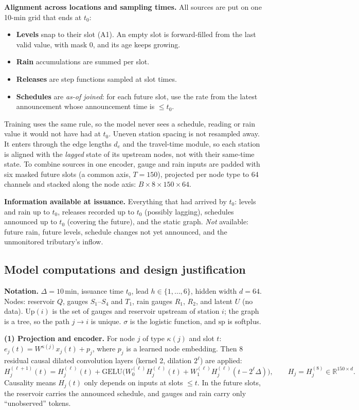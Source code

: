 \textbf{Alignment across locations and sampling times.} All sources are put on one 10-min grid that ends at $t_0$:
\begin{itemize}
\item \textbf{Levels} snap to their slot (A1). An empty slot is forward-filled from the last valid value, with mask 0, and its age keeps growing.
\item \textbf{Rain} accumulations are summed per slot.
\item \textbf{Releases} are step functions sampled at slot times.
\item \textbf{Schedules} are \emph{as-of joined}: for each future slot, use the rate from the latest announcement whose announcement time is $\le t_0$.
\end{itemize}
Training uses the same rule, so the model never sees a schedule, reading or rain value it would not have had at $t_0$.
Uneven station spacing is not resampled away. It enters through the edge lengths $d_e$ and the travel-time
module, so each station is aligned with the \emph{lagged} state of its upstream nodes, not with their same-time state.
To combine sources in one encoder, gauge and rain inputs are padded with six masked future slots (a common axis, $T=150$),
projected per node type to 64 channels and stacked along the node axis: $B\times8\times150\times64$.

\textbf{Information available at issuance.} Everything that had arrived by $t_0$: levels and rain up to $t_0$,
releases recorded up to $t_0$ (possibly lagging), schedules announced up to $t_0$ (covering the future), and the
static graph. \emph{Not} available: future rain, future levels, schedule changes not yet announced, and the
unmonitored tributary's inflow.

\subsection{Model computations and design justification}

\textbf{Notation.} $\Delta=10$\,min, issuance time $t_0$, lead $h\in\{1,\dots,6\}$, hidden width $d=64$.
Nodes: reservoir $Q$, gauges $S_1$--$S_4$ and $T_1$, rain gauges $R_1$, $R_2$, and latent $U$ (no data).
$\mathrm{Up}(i)$ is the set of gauges and reservoir upstream of station $i$; the graph is a tree, so the path
$j\to i$ is unique. $\sigma$ is the logistic function, and $\mathrm{sp}$ is softplus.

\textbf{(1) Projection and encoder.} For node $j$ of type $\kappa(j)$ and slot $t$:
$e_j(t)=W^{\kappa(j)}x_j(t)+p_j$, where $p_j$ is a learned node embedding. Then 8 residual causal
dilated convolution layers (kernel 2, dilation $2^\ell$) are applied:
\[
H^{(\ell+1)}_j(t)=H^{(\ell)}_j(t)+\mathrm{GELU}\big(W^{(\ell)}_0H^{(\ell)}_j(t)+W^{(\ell)}_1H^{(\ell)}_j(t-2^\ell\Delta)\big),\qquad H_j=H^{(8)}_j\in\mathbb R^{150\times d}.
\]
Causality means $H_j(t)$ only depends on inputs at slots $\le t$. In the future slots, the reservoir carries the
announced schedule, and gauges and rain carry only ``unobserved'' tokens.

